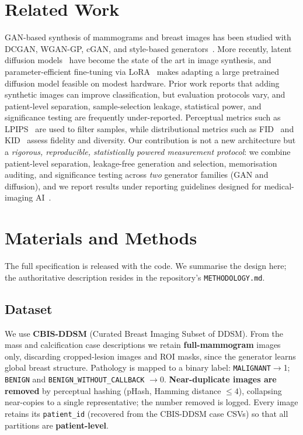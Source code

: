 \documentclass[runningheads]{llncs}
\begin{document}
\section{Related Work}
GAN-based synthesis of mammograms and breast images has been studied with
DCGAN, WGAN-GP, cGAN, and style-based
generators~\cite{goodfellow2014gan,karras2020ada}. More recently, latent
diffusion models~\cite{rombach2022ldm} have become the state of the art in image
synthesis, and parameter-efficient fine-tuning via LoRA~\cite{hu2022lora} makes
adapting a large pretrained diffusion model feasible on modest hardware. Prior
work reports that adding synthetic images can improve classification, but
evaluation protocols vary, and patient-level separation, sample-selection
leakage, statistical power, and significance testing are frequently
under-reported. Perceptual metrics such as LPIPS~\cite{zhang2018lpips} are used
to filter samples, while distributional metrics such as FID~\cite{heusel2017fid}
and KID~\cite{binkowski2018kid} assess fidelity and diversity. Our contribution
is not a new architecture but a \emph{rigorous, reproducible, statistically
powered measurement protocol}: we combine patient-level separation, leakage-free
generation and selection, memorisation auditing, and significance testing across
\emph{two} generator families (GAN and diffusion), and we report results under
reporting guidelines designed for medical-imaging
AI~\cite{mongan2020claim,collins2024tripodai,moons2024probastai}.

\section{Materials and Methods}
The full specification is released with the code. We summarise the design here;
the authoritative description resides in the repository's \texttt{METHODOLOGY.md}.

\subsection{Dataset}
We use \textbf{CBIS-DDSM} (Curated Breast Imaging Subset of DDSM). From the mass
and calcification case descriptions we retain \textbf{full-mammogram} images
only, discarding cropped-lesion images and ROI masks, since the generator learns
global breast structure. Pathology is mapped to a binary label:
\texttt{MALIGNANT}$\to$1; \texttt{BENIGN} and \texttt{BENIGN\_WITHOUT\_CALLBACK}
$\to$0. \textbf{Near-duplicate images are removed} by perceptual hashing (pHash,
Hamming distance $\le 4$), collapsing near-copies to a single representative;
the number removed is logged. Every image retains its \texttt{patient\_id}
(recovered from the CBIS-DDSM case CSVs) so that all partitions are
\textbf{patient-level}.
\end{document}

